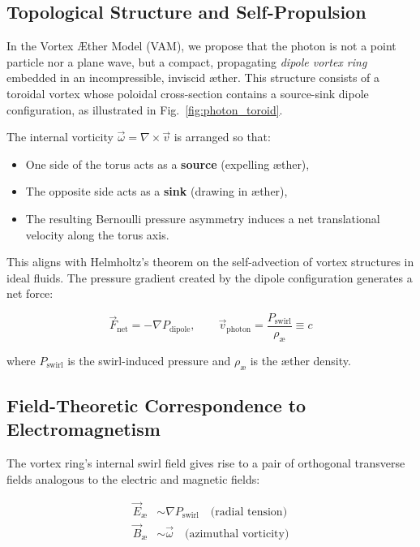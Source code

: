 \subsection{Topological Structure and Self-Propulsion}

In the Vortex Æther Model (VAM), we propose that the photon is not a point particle nor a plane wave, but a compact, propagating \textit{dipole vortex ring} embedded in an incompressible, inviscid æther. This structure consists of a toroidal vortex whose poloidal cross-section contains a source-sink dipole configuration, as illustrated in Fig.~\ref{fig:photon_toroid}.

The internal vorticity $\vec{\omega} = \nabla \times \vec{v}$ is arranged so that:

\begin{itemize}
    \item One side of the torus acts as a \textbf{source} (expelling æther),
    \item The opposite side acts as a \textbf{sink} (drawing in æther),
    \item The resulting Bernoulli pressure asymmetry induces a net translational velocity along the torus axis.
\end{itemize}

This aligns with Helmholtz's theorem on the self-advection of vortex structures in ideal fluids. The pressure gradient created by the dipole configuration generates a net force:

\begin{equation}
    \vec{F}_\text{net} = -\nabla P_{\text{dipole}}, \qquad \vec{v}_{\text{photon}} = \frac{P_{\text{swirl}}}{\rho_\text{\ae}} \equiv c
\end{equation}

\noindent
where $P_{\text{swirl}}$ is the swirl-induced pressure and $\rho_\text{\ae}$ is the æther density.

\subsection{Field-Theoretic Correspondence to Electromagnetism}

The vortex ring’s internal swirl field gives rise to a pair of orthogonal transverse fields analogous to the electric and magnetic fields:

\begin{align}
    \vec{E}_\text{æ} &\sim \nabla P_{\text{swirl}} \quad \text{(radial tension)} \\
    \vec{B}_\text{æ} &\sim \vec{\omega} \quad \text{(azimuthal vorticity)}
\end{align}

